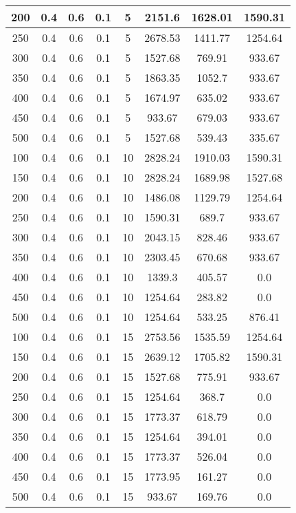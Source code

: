 \documentclass[a4paper, 12pt]{extreport}
\begin{document}
\begin{itemize}
\begin{longtable}{|c|c|c|c|c|c|c|c|}
			200 & 0.4 & 0.6 & 0.1 & 5 & 2151.6 & 1628.01 & 1590.31 \\\hline
			250 & 0.4 & 0.6 & 0.1 & 5 & 2678.53 & 1411.77 & 1254.64 \\\hline
			300 & 0.4 & 0.6 & 0.1 & 5 & 1527.68 & 769.91 & 933.67 \\\hline
			350 & 0.4 & 0.6 & 0.1 & 5 & 1863.35 & 1052.7 & 933.67 \\\hline
			400 & 0.4 & 0.6 & 0.1 & 5 & 1674.97 & 635.02 & 933.67 \\\hline
			450 & 0.4 & 0.6 & 0.1 & 5 & 933.67 & 679.03 & 933.67 \\\hline
			500 & 0.4 & 0.6 & 0.1 & 5 & 1527.68 & 539.43 & 335.67 \\\hline
			100 & 0.4 & 0.6 & 0.1 & 10 & 2828.24 & 1910.03 & 1590.31 \\\hline
			150 & 0.4 & 0.6 & 0.1 & 10 & 2828.24 & 1689.98 & 1527.68 \\\hline
			200 & 0.4 & 0.6 & 0.1 & 10 & 1486.08 & 1129.79 & 1254.64 \\\hline
			250 & 0.4 & 0.6 & 0.1 & 10 & 1590.31 & 689.7 & 933.67 \\\hline
			300 & 0.4 & 0.6 & 0.1 & 10 & 2043.15 & 828.46 & 933.67 \\\hline
			350 & 0.4 & 0.6 & 0.1 & 10 & 2303.45 & 670.68 & 933.67 \\\hline
			400 & 0.4 & 0.6 & 0.1 & 10 & 1339.3 & 405.57 & 0.0 \\\hline
			450 & 0.4 & 0.6 & 0.1 & 10 & 1254.64 & 283.82 & 0.0 \\\hline
			500 & 0.4 & 0.6 & 0.1 & 10 & 1254.64 & 533.25 & 876.41 \\\hline
			100 & 0.4 & 0.6 & 0.1 & 15 & 2753.56 & 1535.59 & 1254.64 \\\hline
			150 & 0.4 & 0.6 & 0.1 & 15 & 2639.12 & 1705.82 & 1590.31 \\\hline
			200 & 0.4 & 0.6 & 0.1 & 15 & 1527.68 & 775.91 & 933.67 \\\hline
			250 & 0.4 & 0.6 & 0.1 & 15 & 1254.64 & 368.7 & 0.0 \\\hline
			300 & 0.4 & 0.6 & 0.1 & 15 & 1773.37 & 618.79 & 0.0 \\\hline
			350 & 0.4 & 0.6 & 0.1 & 15 & 1254.64 & 394.01 & 0.0 \\\hline
			400 & 0.4 & 0.6 & 0.1 & 15 & 1773.37 & 526.04 & 0.0 \\\hline
			450 & 0.4 & 0.6 & 0.1 & 15 & 1773.95 & 161.27 & 0.0 \\\hline
			500 & 0.4 & 0.6 & 0.1 & 15 & 933.67 & 169.76 & 0.0 \\\hline

\end{longtable}
\end{itemize}
\end{document}
